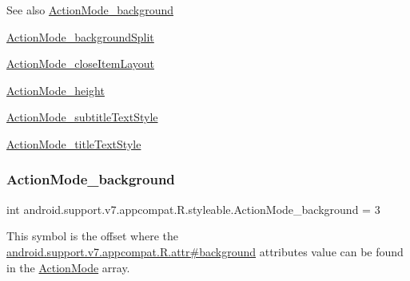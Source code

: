 \begin{DoxySeeAlso}{See also}
\hyperlink{classandroid_1_1support_1_1v7_1_1appcompat_1_1R_1_1styleable_ac2523107dffe1435c22f26b7bc890953}{Action\+Mode\+\_\+background} 

\hyperlink{classandroid_1_1support_1_1v7_1_1appcompat_1_1R_1_1styleable_a846fc9b3ed73107bff2246293ce7763e}{Action\+Mode\+\_\+background\+Split} 

\hyperlink{classandroid_1_1support_1_1v7_1_1appcompat_1_1R_1_1styleable_a0488491d4fd5b6f8773b484815cbebce}{Action\+Mode\+\_\+close\+Item\+Layout} 

\hyperlink{classandroid_1_1support_1_1v7_1_1appcompat_1_1R_1_1styleable_af4cb45abc591ba3b7f173f869cb69cd7}{Action\+Mode\+\_\+height} 

\hyperlink{classandroid_1_1support_1_1v7_1_1appcompat_1_1R_1_1styleable_a79b250cbfc7600ab0f0291cc59dc7bbd}{Action\+Mode\+\_\+subtitle\+Text\+Style} 

\hyperlink{classandroid_1_1support_1_1v7_1_1appcompat_1_1R_1_1styleable_a7c9fa645d0ba6eaae582d3bb1706309a}{Action\+Mode\+\_\+title\+Text\+Style} 
\end{DoxySeeAlso}
\mbox{\label{classandroid_1_1support_1_1v7_1_1appcompat_1_1R_1_1styleable_ac2523107dffe1435c22f26b7bc890953}} 
\subsubsection{\texorpdfstring{Action\+Mode\+\_\+background}{ActionMode\_background}}
{\footnotesize\ttfamily int android.\+support.\+v7.\+appcompat.\+R.\+styleable.\+Action\+Mode\+\_\+background = 3\hspace{0.3cm}{\ttfamily [static]}}

This symbol is the offset where the \hyperlink{classandroid_1_1support_1_1v7_1_1appcompat_1_1R_1_1attr_a9b1855dc381ac6067c08e52a28f5c096}{android.\+support.\+v7.\+appcompat.\+R.\+attr\#background} attribute\textquotesingle{}s value can be found in the \hyperlink{classandroid_1_1support_1_1v7_1_1appcompat_1_1R_1_1styleable_ac4197f1a9a85a8f5973cc5efa358ad9f}{Action\+Mode} array.

